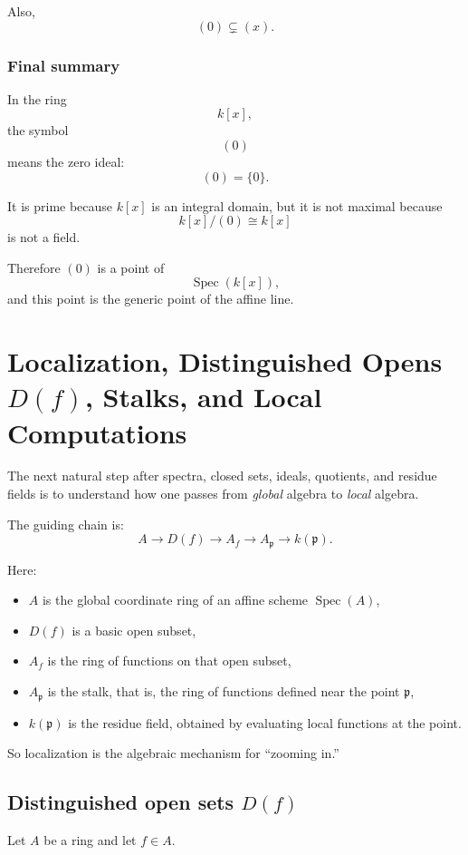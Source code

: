 \documentclass[12pt,a4paper]{article}
\theoremstyle{notespace}
\newcommand{\Spec}{\operatorname{Spec}}
\newcommand{\mf}{\mathfrak}
\theoremstyle{definition}
\begin{document}
Also,
\[
(0)\subsetneq (x).
\]

\subsubsection{Final summary}

In the ring
\[
k[x],
\]
the symbol
\[
(0)
\]
means the zero ideal:
\[
(0)=\{0\}.
\]

It is prime because \(k[x]\) is an integral domain, but it is not maximal because
\[
k[x]/(0)\cong k[x]
\]
is not a field.

Therefore \((0)\) is a point of
\[
\Spec(k[x]),
\]
and this point is the generic point of the affine line.

\section{Localization, Distinguished Opens \(D(f)\), Stalks, and Local Computations}

The next natural step after spectra, closed sets, ideals, quotients, and residue fields is to understand how one passes from \emph{global} algebra to \emph{local} algebra.

The guiding chain is:
\[
A
\longrightarrow
D(f)
\longrightarrow
A_f
\longrightarrow
A_{\mf p}
\longrightarrow
k(\mf p).
\]

Here:

\begin{itemize}
	\item \(A\) is the global coordinate ring of an affine scheme \(\Spec(A)\),
	\item \(D(f)\) is a basic open subset,
	\item \(A_f\) is the ring of functions on that open subset,
	\item \(A_{\mf p}\) is the stalk, that is, the ring of functions defined near the point \(\mf p\),
	\item \(k(\mf p)\) is the residue field, obtained by evaluating local functions at the point.
\end{itemize}

So localization is the algebraic mechanism for ``zooming in.''

\subsection{Distinguished open sets \(D(f)\)}

Let \(A\) be a ring and let \(f\in A\).
\end{document}

